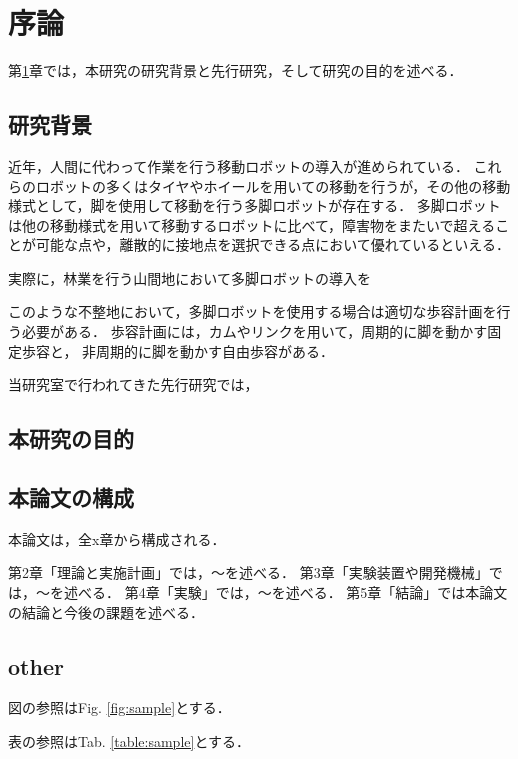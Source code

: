 ﻿%

\chapter{序論}\label{chapter:序論}
第\ref{chapter:序論}章では，本研究の研究背景と先行研究，そして研究の目的を述べる．


\section{研究背景}
近年，人間に代わって作業を行う移動ロボットの導入が進められている．
これらのロボットの多くはタイヤやホイールを用いての移動を行うが，その他の移動様式として，脚を使用して移動を行う多脚ロボットが存在する．
多脚ロボットは他の移動様式を用いて移動するロボットに比べて，障害物をまたいで超えることが可能な点や，離散的に接地点を選択できる点において優れているといえる．

実際に，林業を行う山間地において多脚ロボットの導入を

このような不整地において，多脚ロボットを使用する場合は適切な歩容計画を行う必要がある．
歩容計画には，カムやリンクを用いて，周期的に脚を動かす固定歩容と，
非周期的に脚を動かす自由歩容がある．

当研究室で行われてきた先行研究では，
\section{本研究の目的}


\section{本論文の構成}
本論文は，全x章から構成される．

第2章「理論と実施計画」では，～を述べる．
第3章「実験装置や開発機械」では，～を述べる．
第4章「実験」では，～を述べる．
第5章「結論」では本論文の結論と今後の課題を述べる．

\section{other}
図の参照はFig. \ref{fig:sample}とする．

表の参照はTab. \ref{table:sample}とする．

